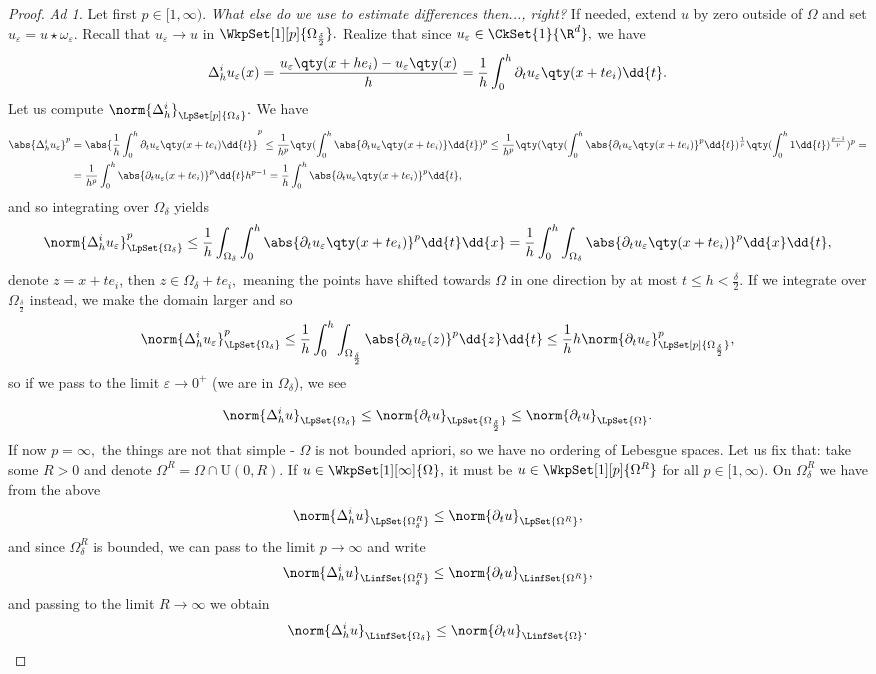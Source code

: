 \begin{proof}
	\textit{Ad 1.}
	Let first $p \in [1, \infty).$ \textit{What else do we use to estimate differences then..., right?} If needed, extend $u$ by zero outside of $\Omega$ and set $u_{\varepsilon} = u \star \omega_{\varepsilon}.$ Recall that $u_{\varepsilon} \to u$ in $\WkpSet[1][p]{\Omega_{\frac{\delta}{2}}}.$ Realize that since $u_{\varepsilon} \in \CkSet{1}{\R^{d}},$ we have
	\[
		\Delta_h^i u_{\varepsilon}(x) = \frac{u_{\varepsilon}\qty(x+h e_i)- u_{\varepsilon}\qty(x)}{h} = \frac{1}{h}\int_0^h \partial_{t} u_{\varepsilon}\qty(x+te_i)\dd{t}.
	\]
	Let us compute $\norm{\Delta_h^i}_{\LpSet[p]{\Omega_{\delta}}}.$ We have
	\begin{align*}
		\abs{\Delta_h^i u_{\varepsilon}}^{p} &= \abs{\frac{1}{h}\int_0^h \partial_{t} u_{\varepsilon}\qty(x+te_i)\dd{t}}^p \leq \frac{1}{h^p}\qty(\int_0^h \abs{\partial_t u_{\varepsilon}\qty(x+te_i)}\dd{t})^p \leq \frac{1}{h^p}\qty(\qty(\int_0^h \abs{\partial_t u_{\varepsilon}\qty(x+te_i)}^p \dd{t})^{\frac{1}{p}}\qty(\int_0^h 1 \dd{t})^{\frac{p-1}{p}})^p = \\ 
				       &=\frac{1}{h^p}\int_0^h \abs{\partial_t u_{\varepsilon}(x+te_i)}^p \dd{t}h^{p-1} = \frac{1}{h}\int_0^h \abs{\partial_t u_{\varepsilon}\qty(x+te_i)}^p\dd{t},
	\end{align*}
	and so integrating over $\Omega_{\delta}$ yields
	\[
		\norm{\Delta_h^i u_{\varepsilon}}_{\LpSet{\Omega_{\delta}}}^p \leq \frac{1}{h} \int_{\Omega_{\delta}}\int_0^h \abs{\partial_t u_{\varepsilon}\qty(x+te_i)}^p\dd{t}\dd{x} = \frac{1}{h}\int_0^h \int_{\Omega_{\delta}}\abs{\partial_t u_{\varepsilon}\qty(x+te_i)}^p\dd{x}\dd{t},
	\]
	denote $z = x + te_i$, then $z \in \Omega_{\delta} + te_i,$ meaning the points have shifted towards $\Omega$ in one direction by at most $t \leq h < \frac{\delta}{2}.$ If we integrate over $\Omega_{\frac{\delta}{2}}$ instead, we make the domain larger and so 
	\[
		\norm{\Delta_h^i u_{\varepsilon}}_{\LpSet{\Omega_{\delta}}}^p\leq \frac{1}{h}\int_0^h \int_{\Omega_{\frac{\delta}{2}}}\abs{\partial_t u_{\varepsilon}(z)}^p\dd{z}\dd{t}\leq \frac{1}{h} h \norm{\partial_t u_{\varepsilon}}_{\LpSet[p]{\Omega_{\frac{\delta}{2}}}}^p,
	\]
	so if we pass to the limit $\varepsilon \to 0^+$ (we are in $\Omega_{\delta}$), we see

	\[
		\norm{\Delta_h^i u}_{\LpSet{\Omega_{\delta}}} \leq \norm{\partial_t u}_{\LpSet{\Omega_{\frac{\delta}{2}}}} \leq \norm{\partial_t u}_{\LpSet{\Omega}}.
	\]
	If now $p = \infty,$ the things are not that simple - $\Omega$ is not bounded apriori, so we have no ordering of Lebesgue spaces. Let us fix that: take some $R>0$ and denote $\Omega^R = \Omega \cap \text{U}(0,R).$ If $u \in \WkpSet[1][\infty]{\Omega},$ it must be $u \in \WkpSet[1][p]{\Omega^R}$ for all $p \in [1, \infty).$ On $\Omega^R_{\delta}$ we have from the above
	\[
		\norm{\Delta_h^i u}_{\LpSet{\Omega_{\delta}^R}}\leq \norm{\partial_t u}_{\LpSet{\Omega^R}},
	\]
	and since $\Omega_{\delta}^R$ is bounded, we can pass to the limit $p \to \infty$ and write
	\[
		\norm{\Delta_h^i u}_{\LinfSet{\Omega_{\delta}^R}}\leq \norm{\partial_t u}_{\LinfSet{\Omega^R}},
	\]
	and passing to the limit $R \to \infty$ we obtain
	\[
		\norm{\Delta_{h}^i u}_{\LinfSet{\Omega_{\delta}}} \leq \norm{\partial_t u}_{\LinfSet{\Omega}}.
	\]


\end{proof}
